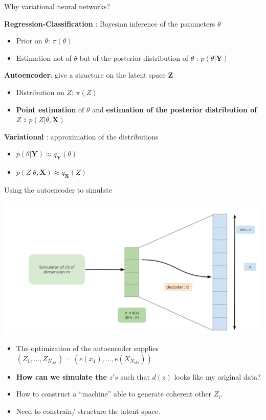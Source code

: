 \documentclass[compress,10pt]{beamer}
\begin{document}
\begin{frame}{Why variational neural networks?}

  \textbf{Regression-Classification} : Bayesian inference of the
  parameters \(\theta\)
\begin{itemize}
\item
   Prior on \(\theta\): \(\pi(\theta)\)
\item
  Estimation not of \(\theta\) but of the posterior distribution of
  \(\theta\) : \(p(\theta | \mathbf{Y})\)
\end{itemize}

  \textbf{Autoencoder}: give a structure on the latent space
  \(\mathbf{Z}\)
  
\begin{itemize}

\item
  Distribution  on \(Z\): \(\pi(Z)\)
\item
  \textbf{Point estimation} of \(\theta\) and \textbf{estimation of  the posterior distribution of \(Z\) :
  \(p(Z | \theta, \mathbf{X})\)}
\end{itemize}


 \textbf{Variational} : approximation of the distributions
\begin{itemize}
 \item
  \(p(\theta | \mathbf{Y}) \approx q_\mathbf{Y}(\theta)\)
\item
  \(p(Z | \theta, \mathbf{X}) \approx q_\mathbf{X}(Z)\)
\end{itemize}
\end{frame}


\begin{frame}{Using the autoencoder to simulate}
\protect\hypertarget{using-the-autoencoder-to-simulate}{}
\begin{center}\includegraphics[width=0.7\linewidth]{images/VarAutoencoder} \end{center}

\begin{itemize}
\item
  The optimization of the autoencoder supplies
  \((Z_1, \dots, Z_{N_{obs}}) = (e(x_1), \dots, e(X_{N_{obs}}))\)
\item
  \textbf{How can we simulate the} \(z's\) such that \(d(z)\) looks like
  my original data?
\item
  How to construct a ``machine'' able to generate coherent other
  \(Z_i\).
\item
  Need to constrain/ structure the latent space.
\end{itemize}
\end{frame}
\end{document}
